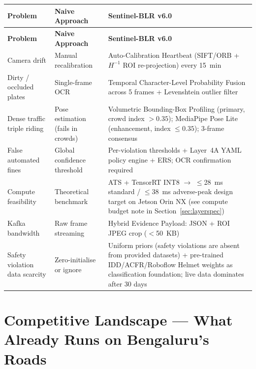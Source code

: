 \documentclass[11pt,a4paper]{article}
\begin{document}
\begin{longtable}{L{3.2cm} L{4.5cm} L{7cm}}
    \toprule
    \color{white}\textbf{Problem} & \color{white}\textbf{Naive Approach} & \color{white}\textbf{Sentinel-BLR v6.0} \\
    \midrule
    \endfirsthead
    \toprule
    \color{white}\textbf{Problem} & \color{white}\textbf{Naive Approach} & \color{white}\textbf{Sentinel-BLR v6.0} \\
    \midrule
    \endhead
    \bottomrule
    \endfoot

    Camera drift & Manual recalibration & Auto-Calibration Heartbeat (SIFT/ORB + $H^{-1}$ ROI re-projection) every 15~min \\
    Dirty / occluded plates & Single-frame OCR & Temporal Character-Level Probability Fusion across 5 frames + Levenshtein outlier filter \\
    Dense traffic triple riding & Pose estimation (fails in crowds) & Volumetric Bounding-Box Profiling (primary, crowd index $> 0.35$); MediaPipe Pose Lite (enhancement, index $\leq 0.35$); 3-frame consensus \\
    False automated fines & Global confidence threshold & Per-violation thresholds + Layer~4A YAML policy engine + ERS; OCR confirmation required \\
    Compute feasibility & Theoretical benchmark & ATS + TensorRT INT8 $\rightarrow$ $\leq$28~ms standard / $\leq$38~ms adverse-peak design target on Jetson Orin NX (see compute budget note in Section~\ref{sec:layerspec}) \\
    Kafka bandwidth & Raw frame streaming & Hybrid Evidence Payload: JSON + ROI JPEG crop ($<$50~KB) \\
    Safety violation data scarcity & Zero-initialise or ignore & Uniform priors (safety violations are absent from provided datasets) + pre-trained IDD/ACFR/Roboflow Helmet weights as classification foundation; live data dominates after 30 days \\
\end{longtable}

\section{Competitive Landscape — What Already Runs on Bengaluru's Roads}
\label{sec:competitive}
\end{document}
